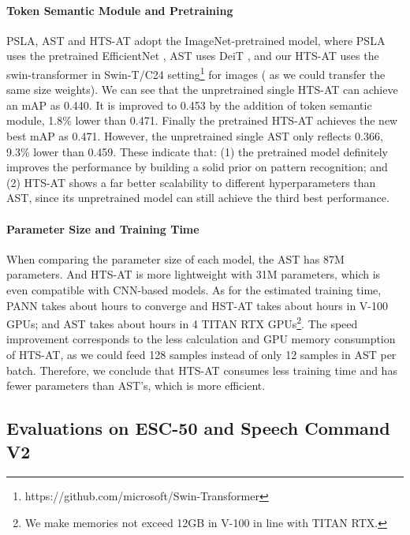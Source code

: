 \documentclass{article}
\begin{document}
\paragraph*{Token Semantic Module and Pretraining} 
PSLA, AST and HTS-AT adopt the ImageNet-pretrained model, where PSLA uses the pretrained EfficientNet \cite{effinet}, AST uses DeiT \cite{deit}, and our HTS-AT uses the swin-transformer in Swin-T/C24 setting\footnote{https://github.com/microsoft/Swin-Transformer} for  images ( as we could transfer the same size weights). We can see that the unpretrained single HTS-AT can achieve an mAP as 0.440. It is improved to 0.453 by the addition of token semantic module, 1.8\% lower than 0.471. Finally the pretrained HTS-AT achieves the new best mAP as 0.471. However, the unpretrained single AST only reflects 0.366, 9.3\% lower than 0.459. These indicate that: (1) the pretrained model definitely improves the performance by building a solid prior on pattern recognition; and (2) HTS-AT shows a far better scalability to different hyperparameters than AST, since its unpretrained model can still achieve the third best performance. 





\paragraph*{Parameter Size and Training Time}
When comparing the parameter size of each model, the AST has 87M parameters. And HTS-AT is more lightweight with 31M parameters, which is even compatible with CNN-based models. As for the estimated training time, PANN takes about  hours to converge and HST-AT takes about  hours in V-100 GPUs; and AST takes about  hours in 4 TITAN RTX GPUs\footnote{We make memories not exceed 12GB in V-100 in line with TITAN RTX.}. The speed improvement corresponds to the less calculation and GPU memory consumption of HTS-AT, as we could feed 128 samples instead of only 12 samples in AST per batch. Therefore, we conclude that HTS-AT consumes less training time and has fewer parameters than AST's, which is more efficient. 











\vspace{-0.2cm}
\subsection{Evaluations on ESC-50 and Speech Command V2}
\vspace{-0.1cm}
\end{document}
